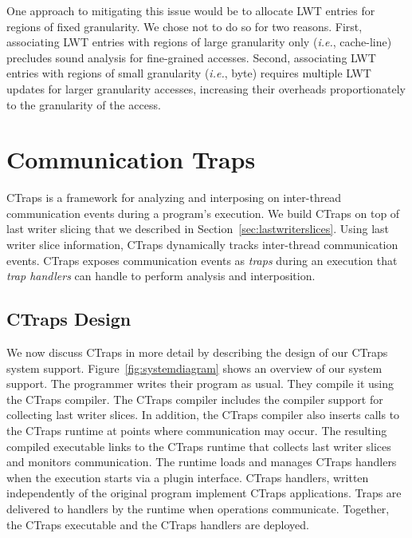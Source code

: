 \documentclass[preprint,9pt]{sigplanconf}
\newcommand{\ctraps}{CTraps\xspace}
\newcommand{\lwt}{LWT\xspace}
\begin{document}
One approach to mitigating this issue would be to allocate \lwt entries for
regions of fixed granularity.  We chose not to do so for two reasons.  First,
associating \lwt entries with regions of  large granularity only ({\em i.e.},
cache-line) precludes sound analysis for fine-grained accesses.  Second,
associating \lwt entries with regions of small granularity ({\em i.e.}, byte)
requires multiple \lwt updates for larger granularity accesses, increasing
their overheads proportionately to the granularity of the access.





\section{Communication Traps}
\label{sec:ctraps}

\ctraps is a framework for analyzing and interposing on inter-thread
communication events during a program's execution.  We build \ctraps on top of
last writer slicing that we described in Section~\ref{sec:lastwriterslices}.
Using last writer slice information, \ctraps dynamically tracks 
inter-thread communication events. \ctraps exposes communication
events as {\em traps} during an execution that {\em trap handlers} can handle
to perform analysis and interposition.  

\subsection{\ctraps Design}

We now discuss \ctraps in more detail by describing the design of our \ctraps
system support.  Figure~\ref{fig:systemdiagram} shows an overview of our system
support.  The programmer writes their program as usual.  They compile it using
the \ctraps compiler. The \ctraps compiler includes the compiler support for
collecting last writer slices.  In addition, the \ctraps compiler also inserts
calls to the \ctraps runtime at points where communication may occur.  The
resulting compiled executable links to the \ctraps runtime that collects last
writer slices and monitors communication.  The runtime loads and manages \ctraps
handlers when the execution starts via a plugin interface.  \ctraps handlers,
written independently of the original program implement \ctraps applications.
Traps are delivered to handlers by the runtime when operations communicate.
Together, the \ctraps executable and the \ctraps handlers are deployed.
\end{document}
